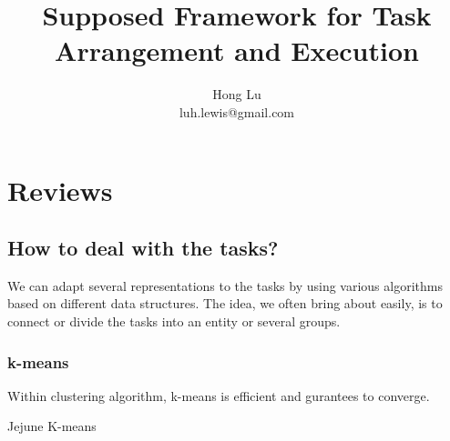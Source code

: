 \documentclass[12pt, a4paper]{article}
\author{Hong Lu \\ luh.lewis@gmail.com}
\date{}
\begin{document}
    \title{Supposed Framework for Task Arrangement and Execution}
    \maketitle

    \section{Reviews}
    \subsection*{How to deal with the tasks?}
    We can adapt several representations to the tasks by using various algorithms based on different data structures.
    The idea, we often bring about easily, is to connect or divide the tasks into an entity or several groups.
    \subsubsection*{k-means}
    Within clustering algorithm, k-means is efficient and gurantees to converge.
    \begin{algorithm}[H]
        \SetAlgoLined


        \caption{Jejune K-means}
    \end{algorithm}
\end{document}
